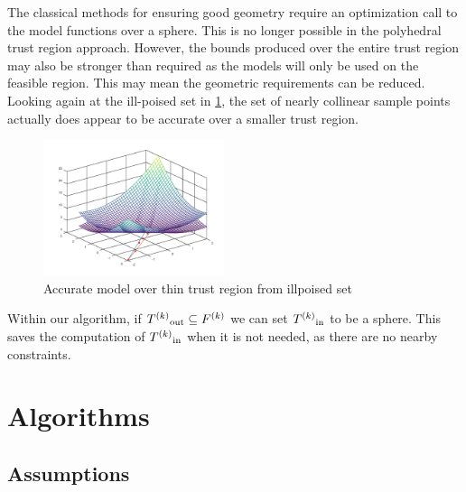 The classical methods for ensuring good geometry require an optimization call to the model functions over a sphere.
This is no longer possible in the polyhedral trust region approach.
However, the bounds produced over the entire trust region may also be stronger than required as the models will only be used on the feasible region.
This may mean the geometric requirements can be reduced.
Looking again at the ill-poised set in \cref{aoip}, the set of nearly collinear sample points actually does appear to be accurate over a smaller trust region.


\begin{figure}[h]
    \centering
    \includegraphics[width=200px]{images/poised_bad_but_good.png}
    \caption{Accurate model over thin trust region from illpoised set}
    \label{aoip}
\end{figure}


Within our algorithm, if $ {T^{(k)}}_{\text{out}} \subseteq {F}^{(k)}$ we can set ${T^{(k)}}_{\text{in}}$ to be a sphere.
This saves the computation of ${T^{(k)}}_{\text{in}}$ when it is not needed, as there are no nearby constraints.



\section{Algorithms}

\subsection{Assumptions}
% 
% 
% 
% 

